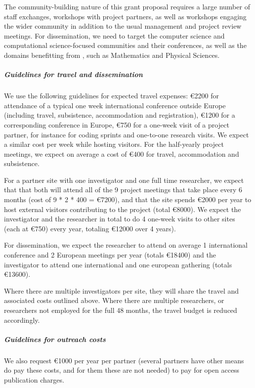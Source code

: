 The community-building nature of this grant proposal requires a large
number of staff exchanges, workshops with project partners, as well as
workshops engaging the wider community in addition to the usual
management and project review meetings. For dissemination, we need to
target the computer science and computational science-focused
communities and their conferences, as well as the domains benefitting
from \TheProject, such as Mathematics and Physical Sciences.

\subparagraph{Guidelines for travel and dissemination}
\label{sect:budget-details-travel}

We use the following guidelines for expected travel expenses:
\euro{2200} for attendance of a typical one week international
conference outside Europe (including travel, subsistence,
accommodation and registration), \euro{1200} for a corresponding
conference in Europe, \euro{750} for a one-week visit of a  project
partner, for instance for coding sprints and one-to-one 
research visits. We expect a similar cost per week while hosting
visitors. For the half-yearly project meetings, we expect on average a
cost of \euro{400} for travel, accommodation and subsistence.

For a partner site with one investigator and one full time researcher,
we expect that that both will attend all of the 9 project meetings that take
place every 6 months (cost of 9 * 2 * 400 =
\euro{7200}), and that the site spends \euro{2000} per year to host
external visitors contributing to the project (total \euro{8000}). We
expect the investigator and the researcher in total to do 4 one-week visits
to other sites (each at \euro{750}) every year, totaling \euro{12000} over 4 years).

For dissemination, we expect the researcher to attend on average 1
international conference and 2 European meetings per year (totals
\euro{18400}) and the investigator to attend one international and one
european gathering (totals \euro{13600}).

Where there are multiple investigators per site, they will share the
travel and associated costs outlined above. Where there are multiple
researchers, or researchers not employed for the full 48 months, the
travel budget is reduced accordingly.

\subparagraph{Guidelines for outreach costs}
\label{sect:budget-outreach-publication-charges}
We also request \euro{1000} per year per partner (several partners
have other means do pay these costs, and for them these are not needed) 
to pay for open access publication charges.

